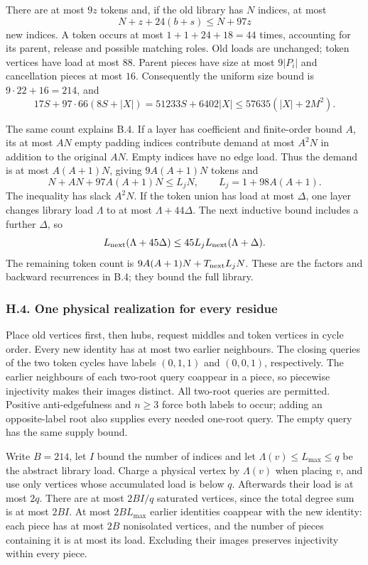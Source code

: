 \documentclass[english,11pt,a4paper]{article}
\begin{document}
There are at most \(9z\) tokens and, if the old library has \(N\) indices, at most \[N+z+24(b+s)\le N+97z\] new indices. A token occurs at most \(1+1+24+18=44\) times, accounting for its parent, release and possible matching roles. Old loads are unchanged; token vertices have load at most \(88\). Parent pieces have size at most \(9|P_i|\) and cancellation pieces at most \(16\). Consequently the uniform size bound is \(9\cdot22+16=214\), and \[17S+97\cdot66(8S+|X|)
=51233S+6402|X|\le57635(|X|+2M^2).\]

The same count explains B.4. If a layer has coefficient and finite-order bound \(A\), its at most \(AN\) empty padding indices contribute demand at most \(A^2N\) in addition to the original \(AN\). Empty indices have no edge load. Thus the demand is at most \(A(A+1)N\), giving \(9A(A+1)N\) tokens and \[N+AN+97A(A+1)N\le L_jN,\qquad L_j=1+98A(A+1).\] The inequality has slack \(A^2N\). If the token union has load at most \(\Delta\), one layer changes library load \(\Lambda\) to at most \(\Lambda+44\Delta\). The next inductive bound includes a further \(\Delta\), so \[L_{\rm next}(\Lambda+45\Delta)
\le45L_jL_{\rm next}(\Lambda+\Delta).\] The remaining token count is \(9A(A+1)N+T_{\rm next}L_jN\). These are the factors and backward recurrences in B.4; they bound the full library.

\subsubsection{H.4. One physical realization for every residue}\label{h.4.-one-physical-realization-for-every-residue}

Place old vertices first, then hubs, request middles and token vertices in cycle order. Every new identity has at most two earlier neighbours. The closing queries of the two token cycles have labels \((0,1,1)\) and \((0,0,1)\), respectively. The earlier neighbours of each two-root query coappear in a piece, so piecewise injectivity makes their images distinct. All two-root queries are permitted. Positive anti-edgefulness and \(n\ge3\) force both labels to occur; adding an opposite-label root also supplies every needed one-root query. The empty query has the same supply bound.

Write \(B=214\), let \(I\) bound the number of indices and let \(\Lambda(v)\le L_{\max}\le q\) be the abstract library load. Charge a physical vertex by \(\Lambda(v)\) when placing \(v\), and use only vertices whose accumulated load is below \(q\). Afterwards their load is at most \(2q\). There are at most \(2BI/q\) saturated vertices, since the total degree sum is at most \(2BI\). At most \(2BL_{\max}\) earlier identities coappear with the new identity: each piece has at most \(2B\) nonisolated vertices, and the number of pieces containing it is at most its load. Excluding their images preserves injectivity within every piece.
\end{document}
